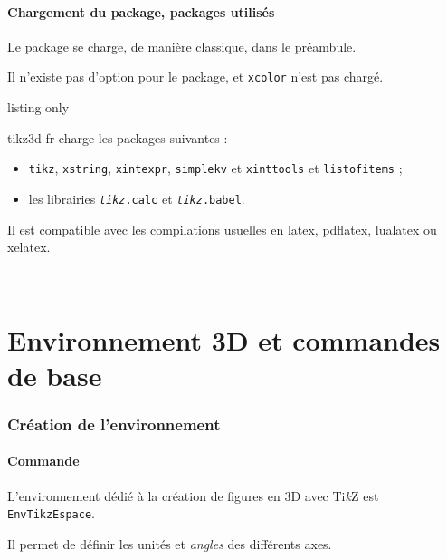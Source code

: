 \documentclass[french,a4paper,11pt]{article}
\providecommand\tikzlogo{Ti\textit{k}Z}
\let\TikZ\tikzlogo
\begin{document}
\subsection{Chargement du package, packages utilisés}

\begin{importantblock}
Le package se charge, de manière classique, dans le préambule.

Il n'existe pas d'option pour le package, et \texttt{xcolor} n'est pas chargé.
\end{importantblock}

\begin{PresCodeTex}{listing only}
\usepackage{tikz3d-fr}
\end{PresCodeTex}

\begin{noteblock}
\textsf{tikz3d-fr} charge les packages suivantes :

\begin{itemize}
	\item \texttt{tikz}, \texttt{xstring}, \texttt{xintexpr}, \texttt{simplekv} et \texttt{xinttools} et \texttt{listofitems} ;
	\item les librairies \texttt{\textit{tikz}.calc} et \texttt{\textit{tikz}.babel}.
\end{itemize}

Il est compatible avec les compilations usuelles en \textsf{latex}, \textsf{pdflatex}, \textsf{lualatex} ou \textsf{xelatex}.
\end{noteblock}

\vfill~

\pagebreak

\part{Environnement 3D et commandes de base}

\section{Création de l'environnement}

\subsection{Commande}

\begin{cautionblock}
L'environnement dédié à la création de figures en 3D avec \TikZ{} est \texttt{EnvTikzEspace}.

Il permet de définir les unités et \textit{angles} des différents axes.
\end{cautionblock}
\end{document}
